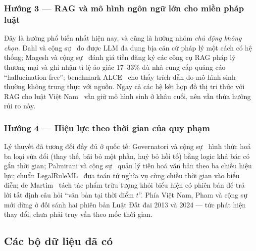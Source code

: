 \subsubsection{Hướng 3 --- RAG và mô hình ngôn ngữ lớn cho miền pháp luật}

Đây là hướng phổ biến nhất hiện nay, và cũng là hướng nhóm \emph{chủ động không chọn}. Dahl
và cộng sự~\cite{dahl} đo được LLM đa dụng bịa căn cứ pháp lý một cách có hệ thống; Magesh
và cộng sự~\cite{magesh} đánh giá tiền đăng ký các công cụ RAG pháp lý thương mại và ghi
nhận tỉ lệ ảo giác 17--33\% dù nhà cung cấp quảng cáo ``hallucination-free''; benchmark
ALCE~\cite{alce} cho thấy trích dẫn do mô hình sinh thường không trung thực với nguồn. Ngay
cả các hệ kết hợp đồ thị tri thức với RAG cho luật Việt Nam~\cite{phamKGRAG,laura} vẫn giữ
mô hình sinh ở khâu cuối, nên vẫn thừa hưởng rủi ro này.

\subsubsection{Hướng 4 --- Hiệu lực theo thời gian của quy phạm}

Lý thuyết đã tương đối đầy đủ ở quốc tế: Governatori và cộng sự~\cite{governatori} hình
thức hoá ba loại sửa đổi (thay thế, bãi bỏ một phần, huỷ bỏ hồi tố) bằng logic khả bác có
gắn thời gian; Palmirani và cộng sự~\cite{palmirani} quản lý tiến hoá văn bản theo ba chiều
hiệu lực; chuẩn LegalRuleML~\cite{legalruleml} đưa toán tử nghĩa vụ cùng chiều thời gian vào
biểu diễn; de Martim~\cite{demartim} tách tác phẩm trừu tượng khỏi biểu hiện có phiên bản để
trả lời tất định câu hỏi ``văn bản tại thời điểm $t$''. Phía Việt Nam, Pham và cộng
sự~\cite{phamLegalOntoUpdate} mới dừng ở đối sánh hai phiên bản Luật Đất đai 2013 và 2024
--- tức phát hiện thay đổi, chưa phải truy vấn theo mốc thời gian.

\subsection{Các bộ dữ liệu đã có}

